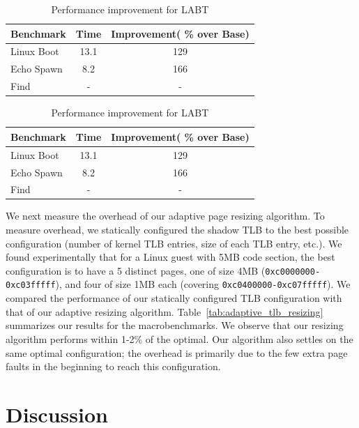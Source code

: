 \documentclass[10pt,twocolumn]{article}
\begin{document}
\begin{table}[!b]
\centering
\caption{Performance improvement for LABT}
     \begin{tabular}{lcc} \hline
       Benchmark  & Time & Improvement( \% over Base)  \\ \hline
       Linux Boot & 13.1 & 129  \\
       Echo Spawn & 8.2 & 166  \\
       Find & - & -  \\
       \hline
     \end{tabular}
\label{tab:ExpWithout1}
\end{table}

\begin{table}[!b]
\centering
\caption{Performance improvement for LABT}
     \begin{tabular}{lcc} \hline
       Benchmark  & Time & Improvement( \% over Base)  \\ \hline
       Linux Boot & 13.1 & 129  \\
       Echo Spawn & 8.2 & 166  \\
       Find & - & -  \\
       \hline
     \end{tabular}
\label{tab:ExpWithout2}
\end{table}

We next measure the overhead of our adaptive page resizing algorithm. To
measure overhead, we statically configured the shadow TLB to the best
possible configuration (number of kernel TLB entries, size of each TLB
entry, etc.). We found experimentally that for a Linux guest with 5MB code
section, the best configuration is to have a 5 distinct pages, one of size
4MB ({\tt 0xc0000000-0xc03fffff}), and
four of size 1MB each (covering {\tt 0xc0400000-0xc07fffff}). We compared the
performance of
our statically configured TLB configuration with that of our adaptive resizing
algorithm.
Table~\ref{tab:adaptive_tlb_resizing} summarizes our results for the macrobenchmarks.
We observe that our resizing algorithm performs within 1-2\% of the optimal.
Our algorithm also settles on the same optimal configuration; the overhead is
primarily due to the few extra page faults in the beginning to reach this configuration.

\section{Discussion}
\end{document}
